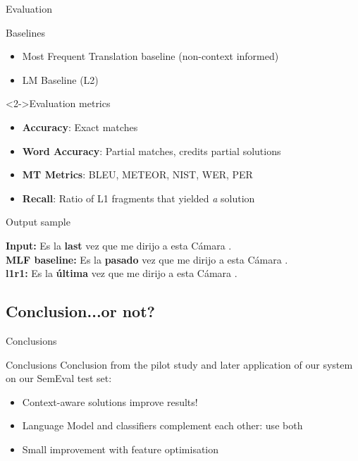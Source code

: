 \documentclass[compress]{beamer}
\begin{document}
\begin{frame}{Evaluation}
  \begin{block}{Baselines}
    \begin{itemize}
      \item Most Frequent Translation baseline {\footnotesize (non-context informed)} 
      \item LM Baseline (L2)
    \end{itemize}
  \end{block}
  
  \begin{block}<2->{Evaluation metrics}
    \begin{itemize}
      \item \textbf{Accuracy}: Exact matches
      \item \textbf{Word Accuracy}: Partial matches, credits partial solutions
      \item \textbf{MT Metrics}: BLEU, METEOR, NIST, WER, PER
      \item \textbf{Recall}: Ratio of L1 fragments that yielded \emph{a} solution
    \end{itemize}
  \end{block}
\end{frame}

\begin{frame}{Output sample}
    \begin{example}
        {\footnotesize
        \textbf{Input:} Es la \textbf{last} vez que me dirijo a esta C\'amara . \\
        \textbf{MLF baseline:} Es la \textbf{pasado} vez que me dirijo a esta C\'amara .\\
        \textbf{l1r1:} Es la \textbf{\'ultima} vez que me dirijo a esta C\'amara .\\
        }
    \end{example}
\end{frame}

\subsection{Conclusion...or not?}

\begin{frame}{Conclusions}
    \begin{block}{Conclusions}
        Conclusion from the pilot study and later application of our system on our
        SemEval test set:
        \begin{itemize}
            \item Context-aware solutions improve results!
            \item Language Model and classifiers complement each other: use both
            \item Small improvement with feature optimisation
        \end{itemize}
    \end{block}
\end{frame}
\end{document}
